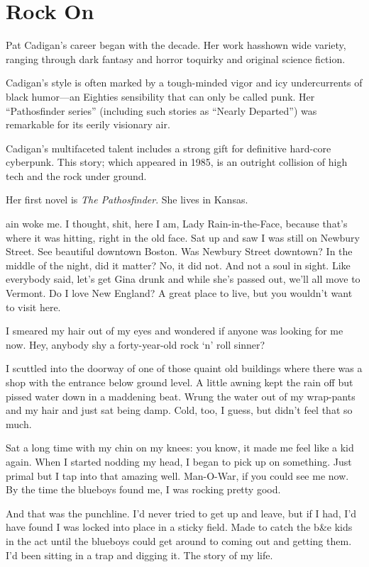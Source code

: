 \chapter{Rock On}

Pat Cadigan's career began with the decade. Her work hasshown wide variety, ranging through dark fantasy and horror toquirky and original science fiction.

Cadigan's style is often marked by a tough-minded vigor and icy undercurrents of black humor—an Eighties sensibility that can only be called punk. Her ``Pathosfinder series'' (including such stories as ``Nearly Departed'') was remarkable for its eerily visionary air.

Cadigan's multifaceted talent includes a strong gift for definitive hard-core cyberpunk. This story; which appeared in 1985, is an outright collision of high tech and the rock under ground.

Her first novel is \textit{The Pathosfinder}. She lives in Kansas.

\hrulefill

ain woke me. I thought, shit, here I am, Lady Rain-in-the-Face, because that's where it was hitting, right in the old face. Sat up and saw I was still on Newbury Street. See beautiful downtown Boston. Was Newbury Street downtown? In the middle of the night, did it matter? No, it did not. And not a soul in sight. Like everybody said, let's get Gina drunk and while she's passed out, we'll all move to Vermont. Do I love New England? A great place to live, but you wouldn't want to visit here.

I smeared my hair out of my eyes and wondered if anyone was looking for me now. Hey, anybody shy a forty-year-old rock `n' roll sinner?

I scuttled into the doorway of one of those quaint old buildings where there was a shop with the entrance below ground level. A little awning kept the rain off but pissed water down in a maddening beat. Wrung the water out of my wrap-pants and my hair and just sat being damp. Cold, too, I guess, but didn't feel that so much.

Sat a long time with my chin on my knees: you know, it made me feel like a kid again. When I started nodding my head, I began to pick up on something. Just primal but I tap into that amazing well. Man-O-War, if you could see me now. By the time the blueboys found me, I was rocking pretty good.

And that was the punchline. I'd never tried to get up and leave, but if I had, I'd have found I was locked into place in a sticky field. Made to catch the b\&e kids in the act until the blueboys could get around to coming out and getting them. I'd been sitting in a trap and digging it. The story of my life.

